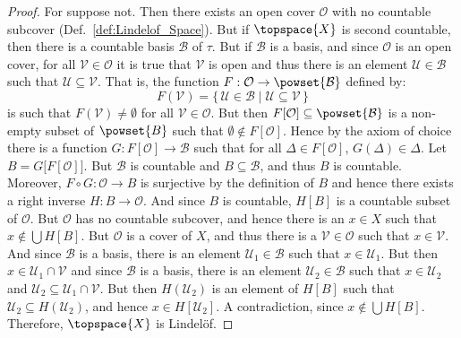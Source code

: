 \documentclass{article}                                                        %
\begin{document}
            \begin{proof}
                For suppose not. Then there exists an open cover $\mathcal{O}$
                with no countable subcover (Def.~\ref{def:Lindelof_Space}). But
                if $\topspace{X}$ is second countable, then there is a countable
                basis $\mathcal{B}$ of $\tau$. But if $\mathcal{B}$ is a basis,
                and since $\mathcal{O}$ is an open cover, for all
                $\mathcal{V}\in\mathcal{O}$ it is true that $\mathcal{V}$ is
                open and thus there is an element $\mathcal{U}\in\mathcal{B}$
                such that $\mathcal{U}\subseteq\mathcal{V}$. That is, the
                function $F:\mathcal{O}\rightarrow\powset{\mathcal{B}}$ defined
                by:
                \begin{equation}
                    F(\mathcal{V})=\{\,\mathcal{U}\in\mathcal{B}\;|\;
                        \mathcal{U}\subseteq\mathcal{V}\,\}
                \end{equation}
                is such that $F(\mathcal{V})\ne\emptyset$ for all
                $\mathcal{V}\in\mathcal{O}$. But then
                $F[\mathcal{O}]\subseteq\powset{\mathcal{B}}$ is a non-empty subset
                of $\powset{B}$ such that $\emptyset\notin{F}[\mathcal{O}]$. Hence
                by the axiom of choice there is a function
                $G:F[\mathcal{O}]\rightarrow\mathcal{B}$ such that for all
                $\Delta\in{F}[\mathcal{O}]$, $G(\Delta)\in\Delta$. Let
                $B=G\big[F[\mathcal{O}]\big]$. But $\mathcal{B}$ is countable and
                $B\subseteq\mathcal{B}$, and thus $B$ is countable. Moreover,
                $F\circ{G}:\mathcal{O}\rightarrow{B}$ is surjective by the
                definition of $B$ and hence there exists a right inverse
                $H:B\rightarrow\mathcal{O}$. And since $B$ is countable,
                $H[B]$ is a countable subset of $\mathcal{O}$. But $\mathcal{O}$ has
                no countable subcover, and hence there is an $x\in{X}$ such that
                $x\notin\bigcup{H}[B]$. But $\mathcal{O}$ is a cover of $X$, and
                thus there is a $\mathcal{V}\in\mathcal{O}$ such that
                $x\in\mathcal{V}$. And since $\mathcal{B}$ is a basis, there is an
                element $\mathcal{U}_{1}\in\mathcal{B}$ such that
                $x\in\mathcal{U}_{1}$. But then $x\in\mathcal{U}_{1}\cap\mathcal{V}$
                and since $\mathcal{B}$ is a basis, there is an element
                $\mathcal{U}_{2}\in\mathcal{B}$ such that $x\in\mathcal{U}_{2}$ and
                $\mathcal{U}_{2}\subseteq\mathcal{U}_{1}\cap\mathcal{V}$. But then
                $H(\mathcal{U}_{2})$ is an element of $H[B]$ such that
                $\mathcal{U}_{2}\subseteq{H}(\mathcal{U}_{2})$, and hence
                $x\in{H}[\mathcal{U}_{2}]$. A contradiction, since
                $x\notin\bigcup{H}[B]$. Therefore, $\topspace{X}$ is Lindel\"{o}f.
            \end{proof}
\end{document}
